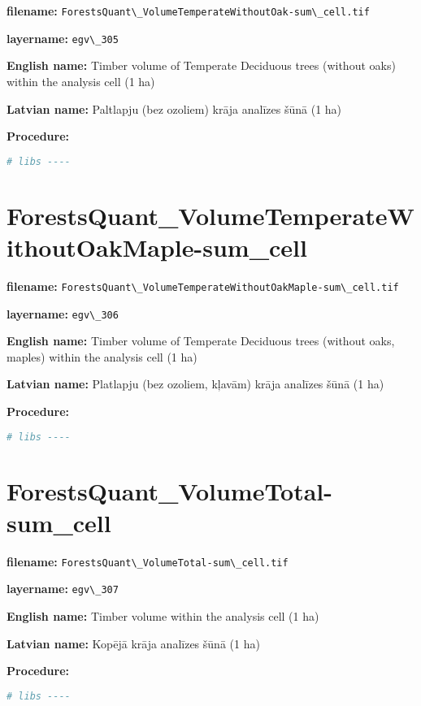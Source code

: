 \documentclass[
]{book}
\newcommand{\passthrough}[1]{#1}
\begin{document}
\textbf{filename:} \passthrough{\lstinline!ForestsQuant\_VolumeTemperateWithoutOak-sum\_cell.tif!}

\textbf{layername:} \passthrough{\lstinline!egv\_305!}

\textbf{English name:} Timber volume of Temperate Deciduous trees (without oaks) within the analysis cell (1 ha)

\textbf{Latvian name:} Paltlapju (bez ozoliem) krāja analīzes šūnā (1 ha)

\textbf{Procedure:}

\begin{lstlisting}[language=R]
# libs ----
\end{lstlisting}

\section{ForestsQuant\_VolumeTemperateWithoutOakMaple-sum\_cell}\label{ch06.306}

\textbf{filename:} \passthrough{\lstinline!ForestsQuant\_VolumeTemperateWithoutOakMaple-sum\_cell.tif!}

\textbf{layername:} \passthrough{\lstinline!egv\_306!}

\textbf{English name:} Timber volume of Temperate Deciduous trees (without oaks, maples) within the analysis cell (1 ha)

\textbf{Latvian name:} Platlapju (bez ozoliem, kļavām) krāja analīzes šūnā (1 ha)

\textbf{Procedure:}

\begin{lstlisting}[language=R]
# libs ----
\end{lstlisting}

\section{ForestsQuant\_VolumeTotal-sum\_cell}\label{ch06.307}

\textbf{filename:} \passthrough{\lstinline!ForestsQuant\_VolumeTotal-sum\_cell.tif!}

\textbf{layername:} \passthrough{\lstinline!egv\_307!}

\textbf{English name:} Timber volume within the analysis cell (1 ha)

\textbf{Latvian name:} Kopējā krāja analīzes šūnā (1 ha)

\textbf{Procedure:}

\begin{lstlisting}[language=R]
# libs ----
\end{lstlisting}
\end{document}
